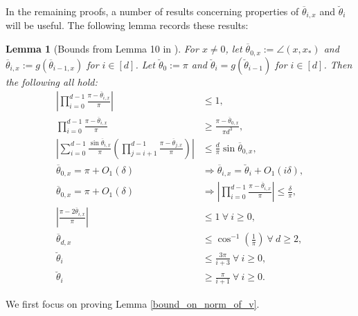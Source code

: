 \documentclass[11pt]{article}
\newtheorem{lem}{Lemma}
\theoremstyle{remark}
\begin{document}
In the remaining proofs, a number of results concerning properties of $\overline{\theta}_{i,x}$ and $\breve{\theta}_{i}$ will be useful. The following lemma records these results: \begin{lem}[Bounds from Lemma 10 in \cite{HV2017}] For $x \neq 0$, let $\overline{\theta}_{0,x} := \angle(x,x_*)$ and  $\overline{\theta}_{i,x} := g(\overline{\theta}_{i-1,x})$ for $i \in [d]$. Let $\breve{\theta}_0 := \pi$ and $\breve{\theta}_i = g(\breve{\theta}_{i-1})$ for $i \in [d]$. Then the following all hold: \begin{align}
\left|\prod_{i=0}^{d-1}\frac{\pi - \overline{\theta}_{i,x}}{\pi}\right| & \leqslant 1, \label{piprod_upperbound}\\
\prod_{i=0}^{d-1}\frac{\pi - \overline{\theta}_{i,x}}{\pi} & \geqslant \frac{\pi - \overline{\theta}_{0,x}}{\pi d^3}, \label{piprod_lowerbound}\\
\left|\sum_{i=0}^{d-1} \frac{\sin \overline{\theta}_{i,x}}{\pi}\left(\prod_{j=i+1}^{d-1} \frac{\pi - \overline{\theta}_{j,x}}{\pi}\right)\right| & \leqslant \frac{d}{\pi}\sin \overline{\theta}_{0,x}, \label{sum_prod_upperbound}\\
\overline{\theta}_{0,x} = \pi + O_1(\delta) & \Longrightarrow \overline{\theta}_{i,x} = \breve{\theta}_i + O_1(i\delta), \label{pi_Oone_bound}\\
\overline{\theta}_{0,x} = \pi + O_1(\delta) & \Longrightarrow \left|\prod_{i=0}^{d-1}\frac{\pi - \overline{\theta}_{i,x}}{\pi}\right| \leqslant \frac{\delta}{\pi}, \label{beta_pi_upperbound} \\
\left|\frac{\pi - 2\overline{\theta}_{i,x}}{\pi}\right| & \leqslant 1\ \forall\ i \geqslant 0, \label{pi_twotheta_upperbound} \\
\overline{\theta}_{d,x}& \leqslant \cos^{-1}\left(\frac{1}{\pi}\right)\ \forall\ d \geqslant 2, \label{cos_inv_bound} \\
\breve{\theta}_i & \leqslant \frac{3\pi}{i + 3}\ \forall\ i \geqslant 0,  \label{breve_theta_bound} \\
\breve{\theta}_i &\geqslant \frac{\pi}{i + 1}\ \forall\ i \geqslant 0. \label{breve_theta_lower_bound}
\end{align}

\end{lem}We first focus on proving Lemma \ref{bound_on_norm_of_v}.
\end{document}
